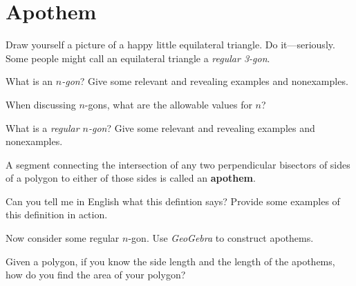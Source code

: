 \newpage
\section{Apothem} %

Draw yourself a picture of a happy little equilateral triangle. Do
it---seriously.  Some people might call an equilateral triangle a
\textit{regular 3-gon}.

\begin{prob} 
What is an \textit{$n$-gon}? Give some relevant and revealing examples
and nonexamples.
\end{prob}

\begin{prob} 
When discussing $n$-gons, what are the allowable values for $n$?
\end{prob}

\begin{prob} 
What is a \textit{regular $n$-gon}? Give some relevant and revealing
examples and nonexamples.
\end{prob}


\begin{definition} 
A segment connecting the intersection of any two perpendicular
bisectors of sides of a polygon to either of those sides is called an
\textbf{apothem}.
\end{definition}

\begin{prob}
Can you tell me in English what this defintion says? Provide some
examples of this definition in action.
\end{prob}



\begin{prob} 
Now consider some regular $n$-gon. Use \textsl{GeoGebra} to construct
apothems.
\end{prob}



\begin{prob}
Given a polygon, if you know the side length and the length of the
apothems, how do you find the area of your polygon? 
\end{prob}


